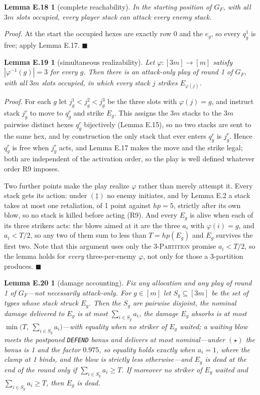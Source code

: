 \documentclass[11pt,a4paper]{article}
\theoremstyle{plain}
\newtheorem*{lemEreachfour}{Lemma E.18}
\newtheorem*{lemEreal}{Lemma E.19}
\newtheorem*{lemEaccfour}{Lemma E.20}
\theoremstyle{definition}
\theoremstyle{plain}
\theoremstyle{definition}
\theoremstyle{remark}
\newcommand{\THREEPART}{\textsc{3-Partition}}
\newcommand{\src}[1]{\texttt{#1}}
\newcommand{\qedbox}{\hfill$\blacksquare$}
\begin{document}
\begin{lemEreachfour}[complete reachability]
In the starting position of $G_F$, with all $3m$ slots occupied, every player stack can attack
every enemy stack.
\end{lemEreachfour}

\noindent\emph{Proof.} At the start the occupied hexes are exactly row 0 and the $e_g$, so
every $q_g^1$ is free; apply Lemma E.17. \qedbox

\begin{lemEreal}[simultaneous realizability]
Let $\varphi:[3m]\to[m]$ satisfy $|\varphi^{-1}(g)|=3$ for every $g$. Then there is an
attack-only play of round 1 of $G_F$, with all $3m$ slots occupied, in which every stack $j$
strikes $E_{\varphi(j)}$.
\end{lemEreal}

\noindent\emph{Proof.} For each $g$ let $j_g^1<j_g^2<j_g^3$ be the three slots with
$\varphi(j)=g$, and instruct stack $j_g^r$ to move to $q_g^r$ and strike $E_g$. This assigns
the $3m$ stacks to the $3m$ pairwise distinct hexes $q_g^r$ bijectively (Lemma E.15), so no
two stacks are sent to the same hex, and by construction the only stack that ever enters
$q_g^r$ is $j_g^r$. Hence $q_g^r$ is free when $j_g^r$ acts, and Lemma E.17 makes the move and
the strike legal; both are independent of the activation order, so the play is well defined
whatever order R9 imposes.

Two further points make the play realize $\varphi$ rather than merely attempt it. Every stack
gets its action: under $(\ddagger)$ no enemy initiates, and by Lemma E.2 a stack takes at most
one retaliation, of 1 point against $\mathit{hp}=5$, strictly after its own blow, so no stack
is killed before acting (R9). And every $E_g$ is alive when each of its three strikers acts:
the blows aimed at it are the three $a_i$ with $\varphi(i)=g$, and $a_i<T/2$, so any two of
them sum to less than $T=\mathit{hp}(E_g)$ and $E_g$ survives the first two. Note that this
argument uses only the \THREEPART{} promise $a_i<T/2$, so the lemma holds for \emph{every}
three-per-enemy $\varphi$, not only for those a 3-partition produces. \qedbox

\begin{lemEaccfour}[damage accounting]
Fix any allocation and any play of round 1 of $G_F$---not necessarily attack-only. For
$g\in[m]$ let $S_g\subseteq[3m]$ be the set of types whose stack struck $E_g$. Then the $S_g$
are pairwise disjoint, the nominal damage delivered to $E_g$ is at most $\sum_{i\in S_g}a_i$,
the damage $E_g$ absorbs is at most $\min\bigl(T,\ \sum_{i\in S_g}a_i\bigr)$---with equality
when no striker of $E_g$ waited; a waiting blow meets the postponed \src{DEFEND} bonus and
delivers at most nominal---under $(\star)$ the bonus is 1 and the factor $0.975$, so equality
holds exactly when $a_i=1$, where the clamp at 1 binds, and the blow is strictly less
otherwise---and $E_g$ is dead at the
end of the round only if $\sum_{i\in S_g}a_i\ge T$. If moreover no striker of $E_g$ waited and
$\sum_{i\in S_g}a_i\ge T$, then $E_g$ is dead.
\end{lemEaccfour}
\end{document}
